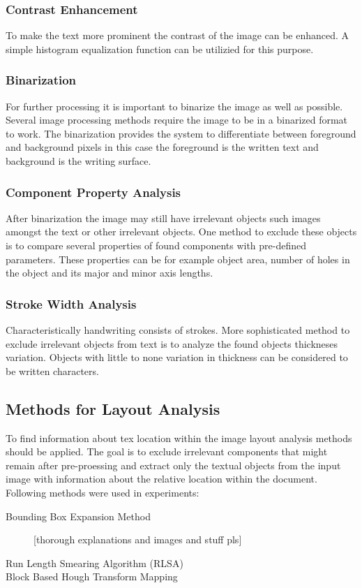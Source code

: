 \documentclass{article}
\begin{document}
        \subsubsection{Contrast Enhancement}
          To make the text more prominent the contrast of the image can be enhanced. A simple histogram equalization function can be utilizied for this purpose.
        \subsubsection{Binarization}
          For further processing it is important to binarize the image as well as possible. Several image processing methods require the image to be in a binarized format to work. The binarization provides the system to differentiate between foreground and background pixels in this case the foreground is the written text and background is the writing surface.
        \subsubsection{Component Property Analysis}
          After binarization the image may still have irrelevant objects such images amongst the text or other irrelevant objects. One method to exclude these objects is to compare several properties of found components with pre-defined parameters. These properties can be for example object area, number of holes in the object and its major and minor axis lengths.
        \subsubsection{Stroke Width Analysis}
          Characteristically handwriting consists of strokes. More sophisticated method to exclude irrelevant objects from text is to analyze the found objects thickneses variation. Objects with little to none variation in thickness can be considered to be written characters.


    \subsection{Methods for Layout Analysis}
      To find information about tex location within the image layout analysis methods should be applied. The goal is to exclude irrelevant components that might remain after pre-proessing and extract only the textual objects from the input image with information about the relative location within the document. Following methods were used in experiments:
      \begin{description}
        \item [Bounding Box Expansion Method] [thorough explanations and images and stuff pls]
        \item [Run Length Smearing Algorithm (RLSA)]
        \item [Block Based Hough Transform Mapping]
      \end{description}
\end{document}
